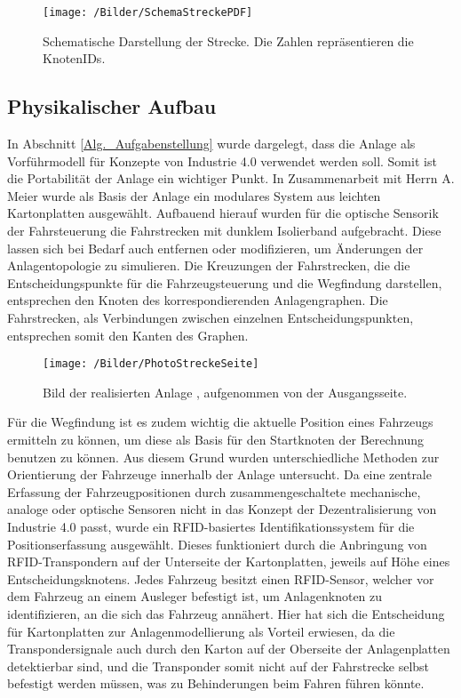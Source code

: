 			\begin{figure}[h]
				\texttt{[image: /Bilder/SchemaStreckePDF]}\\
				\caption{Schematische Darstellung der Strecke. Die Zahlen repräsentieren die KnotenIDs.}\label{Schema Strecke}
			\end{figure}
		
		\subsection{Physikalischer Aufbau}
			\label{Phys_Anlage}
			In Abschnitt \ref{Alg._Aufgabenstellung} wurde dargelegt, dass die Anlage als Vorführmodell für Konzepte von Industrie 4.0  verwendet werden soll. Somit ist die Portabilität der Anlage ein wichtiger Punkt. In Zusammenarbeit mit Herrn A. Meier wurde als Basis der Anlage ein modulares System aus leichten Kartonplatten ausgewählt. Aufbauend hierauf wurden für die optische Sensorik der Fahrsteuerung die Fahrstrecken mit dunklem Isolierband aufgebracht. Diese lassen sich bei Bedarf auch entfernen oder modifizieren, um Änderungen der Anlagentopologie zu simulieren. Die Kreuzungen der Fahrstrecken, die die Entscheidungspunkte für die Fahrzeugsteuerung und die Wegfindung darstellen, entsprechen den Knoten des korrespondierenden Anlagengraphen. Die Fahrstrecken, als Verbindungen zwischen einzelnen Entscheidungspunkten, entsprechen somit den Kanten des Graphen.
			
			\begin{figure}[h]
				\centering
				\texttt{[image: /Bilder/PhotoStreckeSeite]}\label{Photo Strecke}
				\vspace{0.2cm}
				\caption{Bild der realisierten Anlage \cite{Meier16}, aufgenommen von der Ausgangsseite.}
			\end{figure}
			
			Für die Wegfindung ist es zudem wichtig die aktuelle Position eines Fahrzeugs ermitteln zu können, um diese als Basis für den Startknoten der Berechnung benutzen zu können. Aus diesem Grund wurden unterschiedliche Methoden zur Orientierung der Fahrzeuge innerhalb der Anlage untersucht. Da eine zentrale Erfassung der Fahrzeugpositionen durch zusammengeschaltete mechanische, analoge oder optische Sensoren nicht in das Konzept der Dezentralisierung von Industrie 4.0 passt, wurde ein \ac{RFID}-basiertes Identifikationssystem für die Positionserfassung ausgewählt. Dieses funktioniert durch die Anbringung von \ac{RFID}-Transpondern auf der Unterseite der Kartonplatten, jeweils auf Höhe eines Entscheidungsknotens. Jedes Fahrzeug besitzt einen \ac{RFID}-Sensor, welcher vor dem Fahrzeug an einem Ausleger befestigt ist, um Anlagenknoten zu identifizieren, an die sich das Fahrzeug annähert. Hier hat sich die Entscheidung für Kartonplatten zur Anlagenmodellierung als Vorteil erwiesen, da die Transpondersignale auch durch den Karton auf der Oberseite der Anlagenplatten detektierbar sind, und die Transponder somit nicht auf der Fahrstrecke selbst befestigt werden müssen, was zu Behinderungen beim Fahren führen könnte.
			
